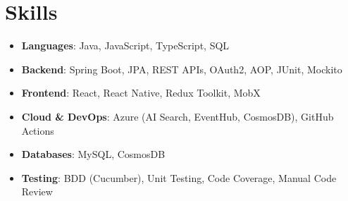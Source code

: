 \documentclass[letterpaper,11pt]{article}
\newcommand{\resumeItem}[2]{
  \item\small{
    \textbf{#1}{: #2 \vspace{-2pt}}
  }
}
\newcommand{\resumeSubItem}[2]{\resumeItem{#1}{#2}\vspace{-4pt}}
\newcommand{\resumeSubHeadingListStart}{\begin{itemize}[leftmargin=*]}
\newcommand{\resumeSubHeadingListEnd}{\end{itemize}}
\begin{document}
%
\section{Skills}
  \resumeSubHeadingListStart
    \resumeSubItem{Languages}
      {Java, JavaScript, TypeScript, SQL}
    \resumeSubItem{Backend}
      {Spring Boot, JPA, REST APIs, OAuth2, AOP, JUnit, Mockito}
    \resumeSubItem{Frontend}
      {React, React Native, Redux Toolkit, MobX}
    \resumeSubItem{Cloud \& DevOps}
      {Azure (AI Search, EventHub, CosmosDB), GitHub Actions}
    \resumeSubItem{Databases}
      {MySQL, CosmosDB}
    \resumeSubItem{Testing}
      {BDD (Cucumber), Unit Testing, Code Coverage, Manual Code Review}
  \resumeSubHeadingListEnd



\end{document}
